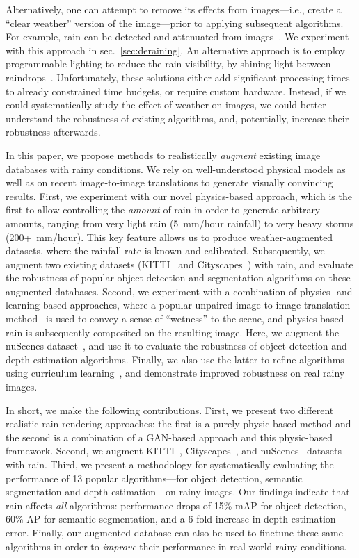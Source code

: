 Alternatively, one can attempt to remove its effects from images---i.e., create a ``clear weather'' version of the image---prior to applying subsequent algorithms. For example, rain can be detected and attenuated from images~\cite{garg2007vision,barnum2010analysis,yang2017deep,zhang2019image,liu2019dual}. We experiment with this approach in sec.~\ref{sec:deraining}. An alternative approach is to employ programmable lighting to reduce the rain visibility, by shining light between raindrops~\cite{de2012fast}. Unfortunately, these solutions either add significant processing times to already constrained time budgets, or require custom hardware. Instead, if we could systematically study the effect of weather on images, we could better understand the robustness of existing algorithms, and, potentially, increase their robustness afterwards. 

In this paper, we propose methods to realistically \emph{augment} existing image databases with rainy conditions. 
We rely on well-understood physical models as well as on recent image-to-image translations to generate visually convincing results. First, we experiment with our novel physics-based approach, which is the first to allow controlling the \emph{amount} of rain in order to generate arbitrary amounts, ranging from very light rain (5~mm/hour rainfall) to very heavy storms (200+~mm/hour). 
This key feature allows us to produce weather-augmented datasets, where the rainfall rate is known and calibrated. Subsequently, we augment two existing datasets (KITTI~\cite{Geiger2012CVPR} and Cityscapes~\cite{Cordts2016Cityscapes}) with rain, and evaluate the robustness of popular object detection and segmentation algorithms on these augmented databases. Second, we experiment with a combination of physics- and learning-based approaches, where a popular unpaired image-to-image translation method~\cite{zhu2017unpaired} is used to convey a sense of ``wetness'' to the scene, and physics-based rain is subsequently composited on the resulting image. Here, we augment the nuScenes dataset~\cite{caesar2019nuscenes}, and use it to evaluate the robustness of object detection and depth estimation algorithms. 
Finally, we also use the latter to refine algorithms using curriculum learning~\cite{bengio2009curriculum}, and demonstrate improved robustness on real rainy images.

In short, we make the following contributions. 
First, we present two different realistic rain rendering approaches: the first is a purely physic-based method and the second is a combination of a GAN-based approach and this physic-based framework. 
Second, we augment KITTI~\cite{Geiger2012CVPR}, Cityscapes~\cite{Cordts2016Cityscapes}, and nuScenes~\cite{caesar2019nuscenes} datasets with rain. 
Third, we present a methodology for systematically evaluating the performance of 13 popular algorithms---for object detection, semantic segmentation and depth estimation---on rainy images. Our findings indicate that rain affects \emph{all} algorithms: performance drops of 15\% mAP for object detection, 60\% AP for semantic segmentation, and a 6-fold increase in depth estimation error. 
Finally, our augmented database can also be used to finetune these same algorithms in order to \emph{improve} their performance in real-world rainy conditions. 

